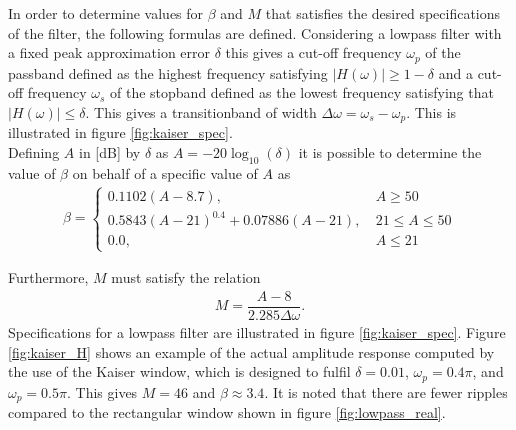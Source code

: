 In order to determine values for $\beta$ and $M$ that satisfies the desired specifications of the filter, the following formulas are defined. Considering a lowpass filter with a fixed peak approximation error $\delta$ this gives a cut-off frequency $\omega_p$ of the passband defined as the highest frequency satisfying $|H(\omega)| \geq 1-\delta$ and a cut-off frequency $\omega_s$ of the stopband defined as the lowest frequency satisfying that $|H(\omega)| \leq \delta$. This gives a transitionband of width $\Delta \omega = \omega_s - \omega_p$. This is illustrated in figure \ref{fig:kaiser_spec}.
\\
Defining $A$ in [dB] by $\delta$ as $A = -20\log_{10} (\delta)$ it is possible to determine the value of $\beta$ on behalf of a specific value of $A$ as \cite{page 566, DTSP}
\begin{align*}
\beta =
\begin{cases}
0.1102\left( A-8.7 \right), &\ A \geq 50 \\
0.5843\left(A-21\right)^{0.4}+0.07886(A-21), &\ 21 \leq A \leq 50 \\
0.0, &\  A \leq 21 
\end{cases}
\end{align*}
       
Furthermore, $M$ must satisfy the relation
\begin{align}
M = \dfrac{A-8}{2.285\Delta \omega}.
\end{align}
Specifications for a lowpass filter are illustrated in figure \ref{fig:kaiser_spec}. Figure \ref{fig:kaiser_H} shows an example of the actual amplitude response computed by the use of the Kaiser window, which is designed to fulfil $\delta=0.01$, $\omega_p = 0.4\pi$, and $\omega_p = 0.5\pi$. This gives $M=46$ and $\beta \approx 3.4$. It is noted that there are fewer ripples compared to the rectangular window shown in figure \ref{fig:lowpass_real}.

